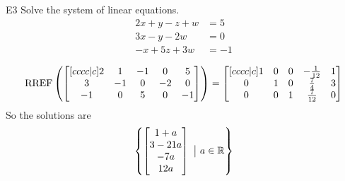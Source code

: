 \documentclass{sbgLAexam}
\begin{document}
\begin{extract}\newpage\end{extract}
\begin{problem}{E3}
Solve the system of linear equations.
\begin{align*}
2x+y-z+w &=5 \\
3x-y-2w &= 0 \\
-x+5z+3w&=-1
\end{align*}
\end{problem}
\begin{solution}
$$\operatorname{RREF}\left( \begin{bmatrix}[cccc|c] 2 & 1 & -1 & 0 & 5 \\ 3 & -1 & 0 & -2 & 0 \\ -1 & 0 & 5 & 0 & -1 \end{bmatrix} \right) = \begin{bmatrix}[cccc|c] 1 & 0 & 0 & -\frac{1}{12} & 1 \\ 0 & 1 & 0 & \frac{7}{4} & 3 \\ 0 & 0 & 1 & \frac{7}{12} & 0 \end{bmatrix}$$
So the solutions are $$\left\{ \begin{bmatrix} 1+a \\ 3-21a \\ -7a \\ 12a \end{bmatrix}\ \big|\ a \in \mathbb{R}\right\}$$
\end{solution}
\end{document}

